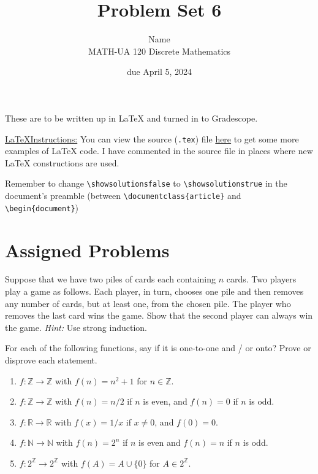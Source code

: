 \documentclass{article}
\title{Problem Set 6}
\author{%
    Name
\\  MATH-UA 120 Discrete Mathematics
}
\date{due April 5, 2024}
\newif\ifshowsolutions
\newcommand{\danger}{\marginpar[\hfill\dbend]{\dbend\hfill}}
\newcommand{\Z}{\mathbb{Z}}
\newcommand{\N}{\mathbb{N}}
\newcommand{\R}{\mathbb{R}}
\theoremstyle{definition}
\begin{document}
\maketitle



These are to be written up in \LaTeX{} and turned in to Gradescope.



\ifshowsolutions
    \SetupExSheets{solution/print=true}
\else
    \danger
 \underline{ \LaTeX  Instructions:}  You can view the source (\texttt{.tex}) file \href{https://bit.ly/4cCEb3d}{here} to get some more examples of \LaTeX{} code.  I have commented in the source file in places where new \LaTeX{} constructions are used.
  
  Remember to change \verb|\showsolutionsfalse| to \verb|\showsolutionstrue|
    in the document's preamble 
    (between \verb|\documentclass{article}| and \verb|\begin{document}|)
\fi

\section*{Assigned Problems}


\begin{question}{9}
    Suppose that we have two piles of cards each containing \(n\) cards. Two players play a game as follows. Each player, in turn, chooses one pile and then removes any number of cards, but at least one, from the chosen pile. The player who removes the last card wins the game. Show that the second player can always win the game. \textit{Hint:} Use strong induction.
\end{question}
\begin{solution}
\end{solution}


\begin{question}{10}
    For each of the following functions, say if it is one-to-one and / or onto? Prove or disprove each statement.
    \begin{enumerate}
	\item \(f \colon  \Z \to \Z\) with \(f(n) = n^2 + 1\) for \(n \in \Z\).
	\item \(f \colon  \Z \to \Z\) with \(f(n) = n/2\) if \(n\) is even, and \(f(n) = 0\) if \(n\) is odd.
	\item \(f \colon  \R \to \R\) with \(f(x) = 1/x\) if \(x \neq 0\), and \(f(0) = 0\).
	\item \(f\colon \N \to \N\) with \(f(n) = 2^n\) if \(n\) is even and \(f(n) = n\) if \(n\) is odd.
	\item \(f \colon  2^{\Z} \to 2^{\Z}\) with \(f(A) = A \cup \{ 0 \}\) for \(A \in 2^{\Z}\).
    \end{enumerate}
\end{question}
\begin{solution}
\end{solution}
\end{document}
